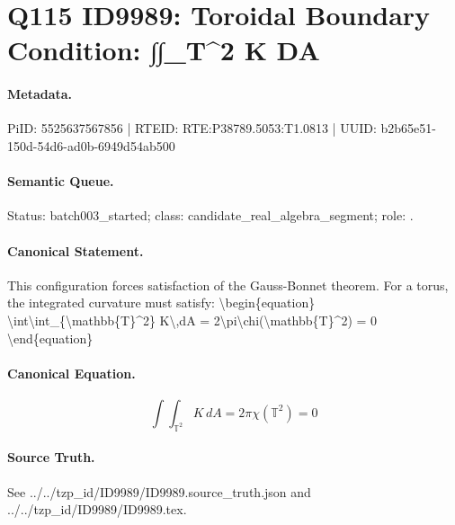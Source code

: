 \section*{Q115 ID9989: Toroidal Boundary Condition: ∫∫\_T\textasciicircum{}2 K DA}
\paragraph{Metadata.}
PiID: 5525637567856 | RTEID: RTE:P38789.5053:T1.0813 | UUID: b2b65e51-150d-54d6-ad0b-6949d54ab500

\paragraph{Semantic Queue.}
Status: batch003\_started; class: candidate\_real\_algebra\_segment; role: .

\paragraph{Canonical Statement.}
This configuration forces satisfaction of the Gauss-Bonnet theorem. For a torus, the integrated curvature must satisfy: \textbackslash{}begin\{equation\} \textbackslash{}int\textbackslash{}int\_\{\textbackslash{}mathbb\{T\}\textasciicircum{}2\} K\textbackslash{},dA = 2\textbackslash{}pi\textbackslash{}chi(\textbackslash{}mathbb\{T\}\textasciicircum{}2) = 0 \textbackslash{}end\{equation\}

\paragraph{Canonical Equation.}
\[
\int\int_{\mathbb{T}^2} K\,dA = 2\pi\chi(\mathbb{T}^2) = 0
\]

\paragraph{Source Truth.}
See ../../tzp\_id/ID9989/ID9989.source\_truth.json and ../../tzp\_id/ID9989/ID9989.tex.
